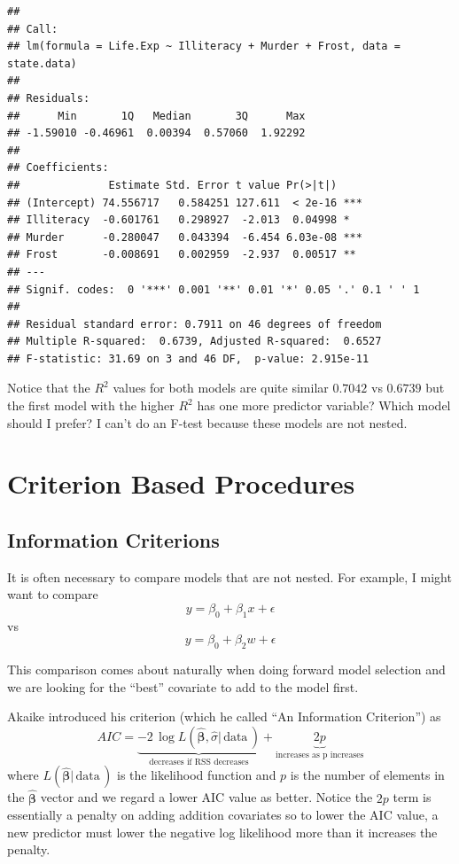 \documentclass[]{book}
\theoremstyle{definition}
\theoremstyle{definition}
\theoremstyle{remark}
\begin{document}
\begin{verbatim}
## 
## Call:
## lm(formula = Life.Exp ~ Illiteracy + Murder + Frost, data = state.data)
## 
## Residuals:
##      Min       1Q   Median       3Q      Max 
## -1.59010 -0.46961  0.00394  0.57060  1.92292 
## 
## Coefficients:
##              Estimate Std. Error t value Pr(>|t|)    
## (Intercept) 74.556717   0.584251 127.611  < 2e-16 ***
## Illiteracy  -0.601761   0.298927  -2.013  0.04998 *  
## Murder      -0.280047   0.043394  -6.454 6.03e-08 ***
## Frost       -0.008691   0.002959  -2.937  0.00517 ** 
## ---
## Signif. codes:  0 '***' 0.001 '**' 0.01 '*' 0.05 '.' 0.1 ' ' 1
## 
## Residual standard error: 0.7911 on 46 degrees of freedom
## Multiple R-squared:  0.6739, Adjusted R-squared:  0.6527 
## F-statistic: 31.69 on 3 and 46 DF,  p-value: 2.915e-11
\end{verbatim}

Notice that the \(R^{2}\) values for both models are quite similar
\(0.7042\) vs \(0.6739\) but the first model with the higher \(R^{2}\)
has one more predictor variable? Which model should I prefer? I can't do
an F-test because these models are not nested.

\section{Criterion Based Procedures}\label{criterion-based-procedures}

\subsection{Information Criterions}\label{information-criterions}

It is often necessary to compare models that are not nested. For
example, I might want to compare \[y=\beta_{0}+\beta_{1}x+\epsilon\] vs
\[y=\beta_{0}+\beta_{2}w+\epsilon\]

This comparison comes about naturally when doing forward model selection
and we are looking for the ``best'' covariate to add to the model first.

Akaike introduced his criterion (which he called ``An Information
Criterion'') as
\[AIC=\underset{\textrm{decreases if RSS decreases}}{\underbrace{-2\,\log L\left(\hat{\boldsymbol{\beta}},\hat{\sigma}|\,\textrm{data}\,\right)}}+\underset{\textrm{increases as p increases}}{\underbrace{2p}}\]
where \(L\left(\hat{\boldsymbol{\beta}}|\,\textrm{data}\,\right)\) is
the likelihood function and \(p\) is the number of elements in the
\(\hat{\boldsymbol{\beta}}\) vector and we regard a lower AIC value as
better. Notice the \(2p\) term is essentially a penalty on adding
addition covariates so to lower the AIC value, a new predictor must
lower the negative log likelihood more than it increases the penalty.
\end{document}
